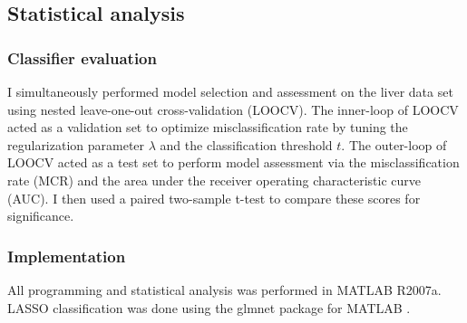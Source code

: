 \subsection{Statistical analysis}
\subsubsection{Classifier evaluation}
I simultaneously performed model selection and assessment on the liver data set using nested leave-one-out cross-validation (LOOCV).
The inner-loop of LOOCV acted as a validation set to optimize misclassification rate by tuning the regularization parameter $\lambda$ and the classification threshold $t$.
The outer-loop of LOOCV acted as a test set to perform model assessment via the misclassification rate (MCR) and the area under the receiver operating characteristic curve (AUC).
I then used a paired two-sample t-test to compare these scores for significance.

\subsubsection{Implementation}
All programming and statistical analysis was performed in MATLAB R2007a.
LASSO classification was done using the glmnet package for MATLAB \cite{Friedman:2009wm}.